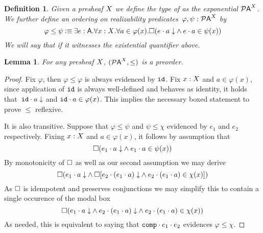 \documentclass[12pt]{article}
\newtheorem{lemm}[thrm]{Lemma}
\newtheorem{defn}[thrm]{Definition}
\begin{document}
\begin{defn}
  Given a presheaf \(X\) we define the type of  as the exponential \({\mathcal{P}{\mathsf{A}}}^{X} \).
  We further define an ordering on realizability
  predicates~\(\varphi, \psi : {\mathcal{P}{\mathsf{A}}}^{X}\) by
  \[
    \varphi \leq \psi
    \IsDefined
    \IExists{e : \A}{
      \IForall{x : \X}{
        \IForall{a \in \varphi(x)}{
          \IBox{(
            \IAnd%
            {\ITotal{\IAp{e}{a}}}%
            {\IAp{e}{a} \in \psi(x)}
          )}
        }
      }
    }
  \]
  We will say that  if
  it witnesses the existential quantifier above.
\end{defn}

%

\begin{lemm}
  For any presheaf \(X\), \(({\mathcal{P}{\mathsf{A}}}^{X}, \leq)\) is a preorder.
\end{lemm}
\begin{proof}
  Fix \(\varphi\), then \(\varphi \leq \varphi\) is always evidenced by
  \(\texttt{id}\).
  Fix \(x : X\) and \(a \in \varphi(x)\), since application of \(\texttt{id}\) is
  always well-defined and behaves as identity, it holds
  that~\({{\texttt{id}}\cdot{a}}\downarrow\) and \({{\texttt{id}}\cdot{a}\in\varphi(x)}\).
  This implies the necessary boxed statement to prove \(\leq\) reflexive.

  It is also transitive. Suppose that \(\varphi \leq \psi\) and
  \(\psi \leq \chi\) evidenced by \(e_{1}\) and \(e_{2}\) respectively.
  Fixing \(x : X\) and \(a \in \varphi(x)\), it follows by assumption that
  \[
    \IBox{(
      \IAnd%
      {\ITotal{\IAp{e_{1}}{a}}}%
      {\IAp{e_{1}}{a} \in \psi(x)}
    )}
  \]
  By monotonicity of \(\Box\) as well as our second assumption we may derive
  \[
    \IBox{(
      \IAnd%
      {\ITotal{\IAp{e_{1}}{a}}}%
      {\IBox{[\IAnd%
        {\ITotal{\IAp{e_{2}}{(\IAp{e_{1}}{a})}}}%
        {\IAp{e_{2}}{(\IAp{e_{1}}{a})} \in \chi(x)}
      ]}}
    )}
  \]
  As \(\Box\) is idempotent and preserves conjunctions we may simplify this
  to contain a single occurence of the modal box
  \[
    \IBox{(
      \IAnd%
      {\ITotal{\IAp{e_{1}}{a}}}%
      {\IAnd%
        {\ITotal{\IAp{e_{2}}{(\IAp{e_{1}}{a})}}}%
        {\IAp{e_{2}}{(\IAp{e_{1}}{a})} \in \chi(x)}
      }
    )}
  \]
  As needed, this is equivalent to saying that
  \({{\texttt{comp}}\cdot{e_{1}}}\cdot{e_{2}}\) evidences \(\varphi \leq \chi\).
\end{proof}
\end{document}
